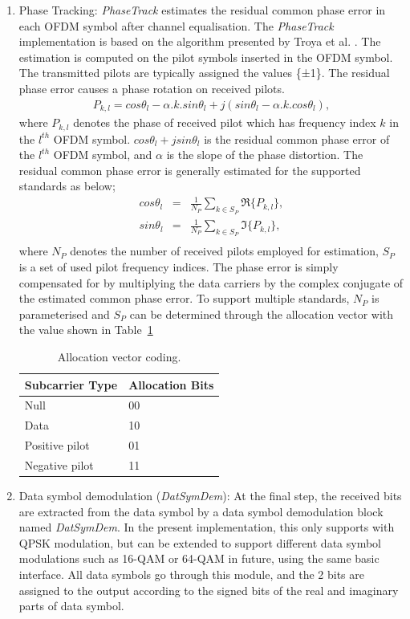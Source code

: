 \begin{enumerate}
\item{Phase Tracking:}
\emph{PhaseTrack} estimates the residual common phase error in each OFDM symbol after channel equalisation. 
The \emph{PhaseTrack} implementation is based on the algorithm presented by Troya et al. \cite{Troya2007}.
The estimation is computed on the pilot symbols inserted in the OFDM symbol. The transmitted pilots are typically assigned
the values \{±1\}. The residual phase error causes a phase rotation on received pilots.
\begin{eqnarray}
\label{PhaseTrack}
P_{k,l} = cos\theta_{l} -\alpha.k.sin \theta_{l} + j (sin\theta_{l} -\alpha.k.cos\theta_{l}),
\end{eqnarray}
where $P_{k,l}$ denotes the phase of received pilot which has frequency index $k$ in the $l^{th}$ OFDM symbol. 
$cos\theta_{l} + j sin\theta_{l}$ is the residual common phase error of the $l^{th}$ OFDM symbol, and $\alpha$ is the slope of the phase distortion.
The residual common phase error is generally estimated for the supported standards as below;
\begin{eqnarray}
\label{CPE}
cos\theta_{l} &=& \frac{1}{N_P} \sum_{k \in S_P} \Re\{P_{k,l}\}, \\ \nonumber
sin\theta_{l} &=& \frac{1}{N_P} \sum_{k \in S_P} \Im\{P_{k,l}\}, \\ \nonumber
\end{eqnarray}
where $N_P$ denotes the number of received pilots employed for estimation, $S_P$ is a set of used pilot frequency indices.
The phase error is simply compensated for by multiplying the data carriers by the complex conjugate of the estimated common phase error.
To support multiple standards, $N_P$ is parameterised and $S_P$ can be determined through the allocation vector with the value shown in Table~\ref{tab:alloc_vec}

\begin{table}[h]
\centering
\caption{Allocation vector coding.}{
\label{tab:alloc_vec}
\renewcommand{\arraystretch}{1.3}
\begin{tabular}{@{}ll@{}}
\toprule
Subcarrier Type		&  Allocation Bits 	\\ \midrule
Null					&  00				\\
Data				&  10				\\
Positive pilot			&  01				\\
Negative pilot		&  11				\\ 
\end{tabular}
}
\end{table}

\item{Data symbol demodulation (\emph{DatSymDem}):}
At the final step, the received bits are extracted from the data symbol by a data symbol demodulation block named \emph{DatSymDem}. 
In the present implementation, this only supports with QPSK modulation, but can be extended to support different data symbol modulations such as 16-QAM or 64-QAM in future, using the same basic interface.
All data symbols go through this module, and the 2 bits are assigned to the output according to the signed bits of the real and imaginary parts of data symbol.

\end{enumerate}

